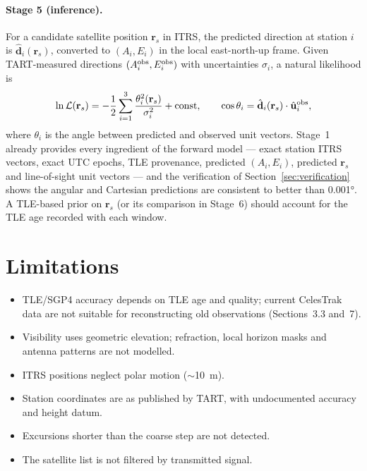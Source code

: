 \documentclass[11pt,a4paper]{article}
\newcommand{\vect}[1]{\mathbf{#1}}
\begin{document}
\paragraph{Stage 5 (inference).} For a candidate satellite position
$\vect r_s$ in ITRS, the predicted direction at station $i$ is
$\hat{\vect d}_i(\vect r_s)$, converted to $(A_i,E_i)$ in the local
east-north-up frame. Given TART-measured directions
$(A_i^{\rm obs},E_i^{\rm obs})$ with uncertainties $\sigma_i$, a natural
likelihood is
\begin{equation}
\ln\mathcal L(\vect r_s) = -\frac12\sum_{i=1}^{3}
\frac{\theta_i^2(\vect r_s)}{\sigma_i^2} + \text{const},\qquad
\cos\theta_i = \hat{\vect d}_i(\vect r_s)\cdot\hat{\vect u}_i^{\rm obs},
\end{equation}
where $\theta_i$ is the angle between predicted and observed unit vectors.
Stage~1 already provides every ingredient of the forward model --- exact
station ITRS vectors, exact UTC epochs, TLE provenance, predicted
$(A_i,E_i)$, predicted $\vect r_s$ and line-of-sight unit vectors --- and the
verification of Section~\ref{sec:verification} shows the angular and
Cartesian predictions are consistent to better than \ang{0.001}. A
TLE-based prior on $\vect r_s$ (or its comparison in Stage~6) should account
for the TLE age recorded with each window.

\section{Limitations}

\begin{itemize}
\item TLE/SGP4 accuracy depends on TLE age and quality; current CelesTrak
data are not suitable for reconstructing old observations
(Sections~3.3 and~7).
\item Visibility uses geometric elevation; refraction, local horizon masks
and antenna patterns are not modelled.
\item ITRS positions neglect polar motion ($\sim$\SI{10}{\metre}).
\item Station coordinates are as published by TART, with undocumented
accuracy and height datum.
\item Excursions shorter than the coarse step are not detected.
\item The satellite list is not filtered by transmitted signal.
\end{itemize}
\end{document}
